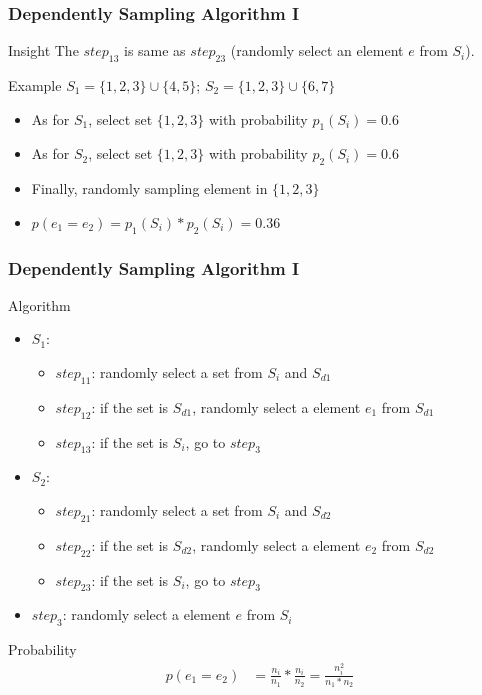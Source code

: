 \documentclass[notheorems, aspectratio=54]{beamer}
\begin{document}
\begin{frame}
    \frametitle{Dependently Sampling Algorithm I}
    \begin{block}{Insight}
        The $step_{13}$ is same as $step_{23}$ (randomly select an element $e$ from $S_i$).
    \end{block}
    \begin{block}{Example}
        $S_1 =  \{1,2,3\} \cup \{4,5\}$; $S_2 = \{1,2,3\} \cup \{6,7\}$
        \begin{itemize}
            \item As for $S_1$, select set $\{1,2,3\}$ with probability $p_1(S_i)=0.6$
            \item As for $S_2$, select set $\{1,2,3\}$ with probability $p_2(S_i)=0.6$
            \item Finally, randomly sampling element in $\{1,2,3\}$
            \item $p(e_1 = e_2) = p_1(S_i)*p_2(S_i) = 0.36$
        \end{itemize}
    \end{block}
\end{frame}

\begin{frame}
    \frametitle{Dependently Sampling Algorithm I}
    \begin{block}{Algorithm}
        \begin{itemize}
            \item $S_1$:
            \begin{itemize}
                \item $step_{11}$: randomly select a set from $S_i$ and $S_{d1}$
                \item $step_{12}$: if the set is $S_{d1}$, randomly select a element $e_1$ from $S_{d1}$
                \item $step_{13}$: if the set is $S_i$, go to $step_{3}$
            \end{itemize}
            \item $S_2$:
            \begin{itemize}
                \item $step_{21}$: randomly select a set from $S_i$ and $S_{d2}$
                \item $step_{22}$: if the set is $S_{d2}$, randomly select a element $e_2$ from $S_{d2}$
                \item $step_{23}$: if the set is $S_i$, go to $step_{3}$
            \end{itemize}
            \item $step_{3}$: randomly select a element $e$ from $S_i$
        \end{itemize}
    \end{block}
    \begin{block}{Probability}
        \begin{equation}
            \begin{aligned}
                p(e_1 = e_2) &=  \frac{n_i}{n_1}*\frac{n_i}{n_2} = \frac{n_i^2}{n_1*n_2}
            \end{aligned}
        \end{equation}
    \end{block}
\end{frame}
\end{document}
